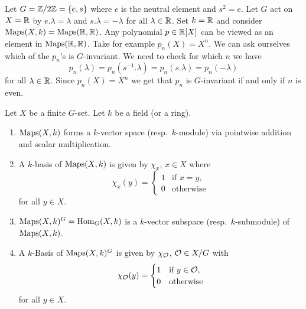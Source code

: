 \begin{expl}
  Let $G = \mathbb{Z}/2\mathbb{Z} = \{e,s\}$ where $e$ is the neutral element and $s^2 = e$.
  Let $G$ act on $X = \mathbb{R}$ by $e.\lambda = \lambda$ and $s.\lambda = -\lambda$ for all $\lambda \in \mathbb{R}$.
  Set $k = \mathbb{R}$ and consider $\operatorname{Maps}(X,k) = \operatorname{Maps}(\mathbb{R},\mathbb{R})$.
  Any polynomial $p \in \mathbb{R}[X]$ can be viewed as an element in $\operatorname{Maps}(\mathbb{R},\mathbb{R})$.
  Take for example $p_n(X) = X^n$.
  We can ask ourselves which of the $p_n$’s is $G$-invariant.
  We need to check for which $n$ we have
  \[
      p_n(\lambda)
    = p_n\left(s^{-1}.\lambda\right)
    = p_n(s.\lambda)
    = p_n(-\lambda)
  \]
  for all $\lambda \in \mathbb{R}$.
  Since $p_n(X) = X^n$ we get that $p_n$ is $G$-invariant if and only if $n$ is even.
\end{expl}


\begin{lem}\label{lem: basis of Maps and Hom}
  Let $X$ be a finite $G$-set.
  Let $k$ be a field (or a ring).
  \begin{enumerate}[label=\emph{\alph*)},leftmargin=*]
    \item
      $\operatorname{Maps}(X,k)$ forms a $k$-vector space (resp.\ $k$-module) via pointwise addition and scalar multiplication.
    \item
      A $k$-basis of $\operatorname{Maps}(X,k)$ is given by $\chi_x$, $x \in X$ where
      \[
          \chi_x(y)
        = \begin{cases}
            1 & \text{if } x = y, \\
            0 & \text{otherwise}
          \end{cases}
      \]
      for all $y \in X$.
    \item
      $\operatorname{Maps}(X,k)^G = \operatorname{Hom}_G(X,k)$ is a $k$-vector subspace (resp.\ $k$-submodule) of $\operatorname{Maps}(X,k)$.
    \item
      A $k$-Basis of $\operatorname{Maps}(X,k)^G$ is given by $\chi_\mathcal{O}$, $\mathcal{O} \in X/G$ with
      \[
          \chi_\mathcal{O}(y)
        = \begin{cases}
            1 & \text{if } y \in \mathcal{O}, \\
            0 & \text{otherwise}
          \end{cases}
      \]
      for all $y \in X$.
  \end{enumerate}
\end{lem}
